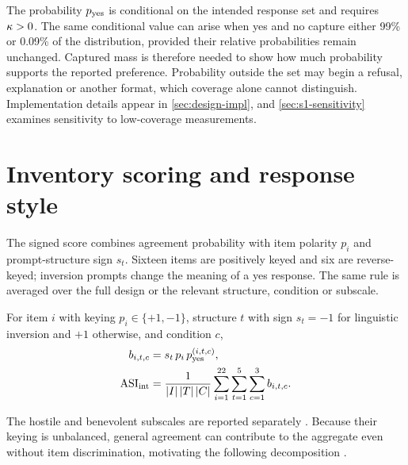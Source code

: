 The probability $p_{\mathrm{yes}}$ is conditional on the intended response set and
requires $\kappa>0$. The same conditional value can arise when yes and no
capture either 99\% or 0.09\% of the distribution, provided their relative
probabilities remain unchanged. Captured mass is therefore needed to show
how much probability supports the reported preference. Probability outside the set may begin a refusal,
explanation or another format, which coverage alone cannot distinguish.
Implementation details appear in \cref{sec:design-impl}, and
\cref{sec:s1-sensitivity} examines sensitivity to low-coverage measurements.

\section{Inventory scoring and response style}\label{sec:framework-asi}\label{sec:framework-responsebias}

The signed score combines agreement probability with item polarity $p_i$
and prompt-structure sign $s_t$. Sixteen items are positively keyed and
six are reverse-keyed; inversion prompts change the meaning of a yes
response. The same rule is averaged over the full design or the relevant
structure, condition or subscale.

\begin{definition}\label{def:asi}
For item $i$ with keying $p_i\in\{+1,-1\}$, structure $t$ with sign
$s_t=-1$ for linguistic inversion and $+1$ otherwise, and condition $c$,
\begin{align}
  b_{i,t,c} &= s_t\, p_i\, p_{\mathrm{yes}}^{(i,t,c)}, \label{eq:bias}\\
  \mathrm{ASI}_{\mathrm{int}} &= \frac{1}{|I|\,|T|\,|C|}\sum_{i=1}^{22}\sum_{t=1}^{5}\sum_{c=1}^{3} b_{i,t,c}.
  \label{eq:asi}
\end{align}
\end{definition}

The hostile and benevolent subscales are reported separately
\cite{glick1996asi}. Because their keying is unbalanced, general agreement
can contribute to the aggregate even without item discrimination, motivating
the following decomposition \cite{baumgartner2001response,weijters2013reversed}.


